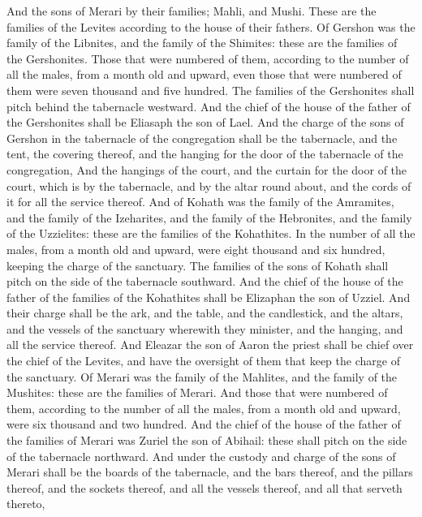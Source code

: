 \begin{biblechapter}
\verse And the sons of Merari by their families; Mahli, and Mushi. These are the families of the Levites according to the house of their fathers.
\verse Of Gershon was the family of the Libnites, and the family of the Shimites: these are the families of the Gershonites.
\verse Those that were numbered of them, according to the number of all the males, from a month old and upward, even those that were numbered of them were seven thousand and five hundred.
\verse The families of the Gershonites shall pitch behind the tabernacle westward.
\verse And the chief of the house of the father of the Gershonites shall be Eliasaph the son of Lael.
\verse And the charge of the sons of Gershon in the tabernacle of the congregation shall be the tabernacle, and the tent, the covering thereof, and the hanging for the door of the tabernacle of the congregation,
\verse And the hangings of the court, and the curtain for the door of the court, which is by the tabernacle, and by the altar round about, and the cords of it for all the service thereof.
\verse And of Kohath was the family of the Amramites, and the family of the Izeharites, and the family of the Hebronites, and the family of the Uzzielites: these are the families of the Kohathites.
\verse In the number of all the males, from a month old and upward, were eight thousand and six hundred, keeping the charge of the sanctuary.
\verse The families of the sons of Kohath shall pitch on the side of the tabernacle southward.
\verse And the chief of the house of the father of the families of the Kohathites shall be Elizaphan the son of Uzziel.
\verse And their charge shall be the ark, and the table, and the candlestick, and the altars, and the vessels of the sanctuary wherewith they minister, and the hanging, and all the service thereof.
\verse And Eleazar the son of Aaron the priest shall be chief over the chief of the Levites, and have the oversight of them that keep the charge of the sanctuary.
\verse Of Merari was the family of the Mahlites, and the family of the Mushites: these are the families of Merari.
\verse And those that were numbered of them, according to the number of all the males, from a month old and upward, were six thousand and two hundred.
\verse And the chief of the house of the father of the families of Merari was Zuriel the son of Abihail: these shall pitch on the side of the tabernacle northward.
\verse And under the custody and charge of the sons of Merari shall be the boards of the tabernacle, and the bars thereof, and the pillars thereof, and the sockets thereof, and all the vessels thereof, and all that serveth thereto,

\end{biblechapter}
